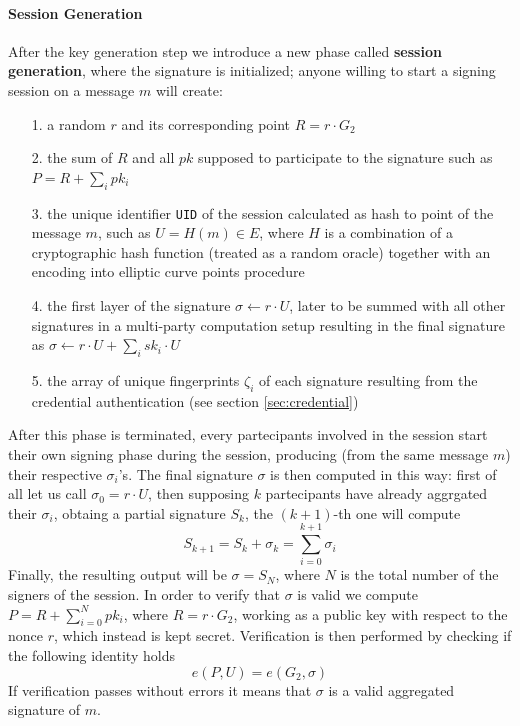 \documentclass[twocolumn]{article}
\begin{document}
\paragraph{Session Generation}
After the key generation step we introduce a new phase called \textbf{session generation}, where the signature is initialized; anyone willing to start a signing session on a message $m$ will create:
\begin{itemize}
    \item[1.] a random $r$ and its corresponding point $R = r\cdot G_2$
    \item[2.] the sum of $R$ and all $pk$ supposed to participate to the signature such as $P = R + \sum_i pk_i$
    \item[3.] the unique identifier \verb!UID! of the session calculated as hash to point of the message $m$, such as $U = H(m)\in E$, where $H$ is a combination of a cryptographic hash function (treated as a random oracle) together with an encoding into elliptic curve points procedure
    \item[4.] the first layer of the signature $\sigma \leftarrow r\cdot U$, later to be summed with all other signatures in a multi-party computation setup resulting in the final signature as $\sigma \leftarrow r\cdot U + \sum_i sk_i\cdot U$
    \item[5.] the array of unique fingerprints $\zeta_i$ of each signature resulting from the credential authentication (see section \ref{sec:credential}) 
\end{itemize}
After this phase is terminated, every partecipants involved in the session start their own signing phase during the session, producing (from the same message $m$) their respective $\sigma_i$'s. The final signature $\sigma$ is then computed in this way: first of all let us call $\sigma_0 = r\cdot U$, then supposing $k$ partecipants have already aggrgated their $\sigma_i$, obtaing a partial signature $S_k$, the $(k+1)$-th one will compute
\[
  S_{k+1}=S_k+\sigma_k = \sum_{i=0}^{k+1} \sigma_i
\]
Finally, the resulting output will be $\sigma = S_N$, where $N$ is the total number of the signers of the session. In order to verify that $\sigma$ is valid we compute $P = R + \sum_{i=0} ^N pk_i$, where $R = r\cdot G_2$, working as a public key with respect to the nonce $r$, which instead is kept secret. Verification is then performed by checking if the following identity holds
    \[ 
    e(P,U) = e(G_2,\sigma)
    \]
If verification passes without errors it means that $\sigma$ is a valid aggregated signature of $m$.
\end{document}
